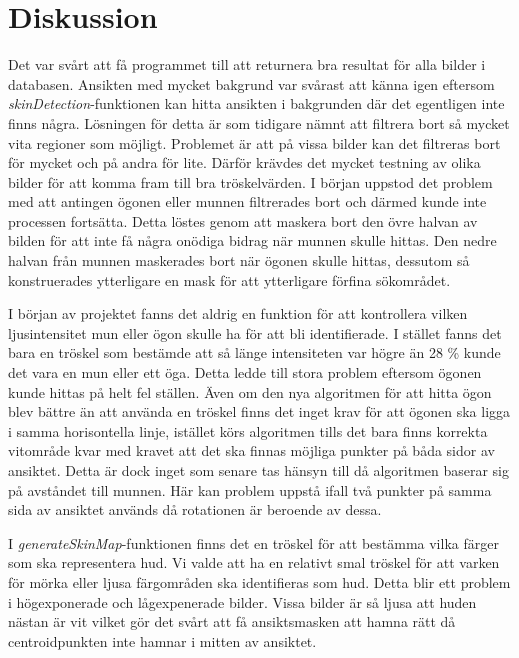 \documentclass[a4paper,12pt,oneside,final]{extbook}
\begin{document}
\chapter{Diskussion}

Det var svårt att få programmet till att returnera bra resultat för alla bilder i databasen. Ansikten med mycket bakgrund var svårast att känna igen eftersom \textit{skinDetection}-funktionen kan hitta ansikten i bakgrunden där det egentligen inte finns några. Lösningen för detta är som tidigare nämnt att filtrera bort så mycket vita regioner som möjligt. Problemet är att på vissa bilder kan det filtreras bort för mycket och på andra för lite. Därför krävdes det mycket testning av olika bilder för att komma fram till bra tröskelvärden. I början uppstod det problem med att antingen ögonen eller munnen filtrerades bort och därmed kunde inte processen fortsätta. 
Detta löstes genom att maskera bort den övre halvan av bilden för att inte få några onödiga bidrag när munnen skulle hittas. Den nedre halvan från munnen maskerades bort när ögonen skulle hittas, dessutom så konstruerades ytterligare en mask för att ytterligare förfina sökområdet. 

I början av projektet fanns det aldrig en funktion för att kontrollera vilken ljusintensitet mun eller ögon skulle ha för att bli identifierade. I stället fanns det bara en tröskel som bestämde att så länge intensiteten var högre än 28 \% kunde det vara en mun eller ett öga. Detta ledde till stora problem eftersom ögonen kunde hittas på helt fel ställen. Även om den nya algoritmen för att hitta ögon blev bättre än att använda en tröskel finns det inget krav för att ögonen ska ligga i samma horisontella linje, istället körs algoritmen tills det bara finns korrekta vitområde kvar med kravet att det ska finnas möjliga punkter på båda sidor av ansiktet. Detta är dock inget som senare tas hänsyn till då algoritmen baserar sig på avståndet till munnen. Här kan problem uppstå ifall två punkter på samma sida av ansiktet används då rotationen är beroende av dessa.


I \textit{generateSkinMap}-funktionen finns det en tröskel för att bestämma vilka färger som ska representera hud. Vi valde att ha en relativt smal tröskel för att varken för mörka eller ljusa färgområden ska identifieras som hud. Detta blir ett problem i högexponerade och lågexpenerade bilder. Vissa bilder är så ljusa att huden nästan är vit vilket gör det svårt att få ansiktsmasken att hamna rätt då centroidpunkten inte hamnar i mitten av ansiktet.
\end{document}

